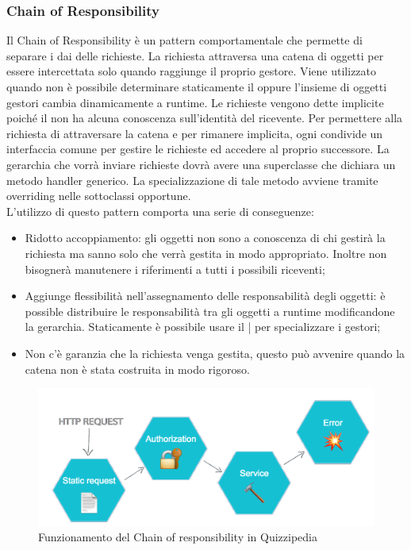 \documentclass[12pt,a4paper]{article}
\begin{document}
\subsubsection{Chain of Responsibility}
Il Chain of Responsibility è un pattern comportamentale che permette di separare i  dai  delle richieste. La richiesta attraversa una catena di oggetti per essere intercettata solo quando raggiunge il proprio gestore. Viene utilizzato quando non è possibile determinare staticamente il  oppure l’insieme di oggetti gestori cambia dinamicamente a runtime. Le richieste vengono dette implicite poiché il  non ha alcuna conoscenza sull’identità del ricevente. Per permettere alla richiesta di attraversare la catena e per rimanere implicita, ogni  condivide un interfaccia comune per gestire le richieste ed accedere al proprio successore. La gerarchia che vorrà inviare richieste dovrà avere una superclasse che dichiara un metodo handler generico. La specializzazione di tale metodo avviene tramite overriding nelle sottoclassi opportune.\\
L’utilizzo di questo pattern comporta una serie di conseguenze:
\begin{itemize}
	\item Ridotto accoppiamento: gli oggetti non sono a conoscenza di chi gestirà la richiesta ma sanno solo che verrà gestita in modo appropriato. Inoltre non bisognerà manutenere i riferimenti a tutti i possibili riceventi;
	\item Aggiunge flessibilità nell’assegnamento delle responsabilità degli oggetti: è possible distribuire le responsabilità tra gli oggetti a runtime modificandone la gerarchia. Staticamente è possibile usare il | per specializzare i gestori;
	\item Non c’è garanzia che la richiesta venga gestita, questo può avvenire quando la catena non è stata costruita in modo rigoroso.
\end{itemize}

\begin{center}
	\begin{figure}[H]
		\centering \includegraphics[max width=\textwidth]{../img/corStarware.png}
		\caption{Funzionamento del Chain of responsibility in Quizzipedia}
	\end{figure}
\end{center}
\end{document}
